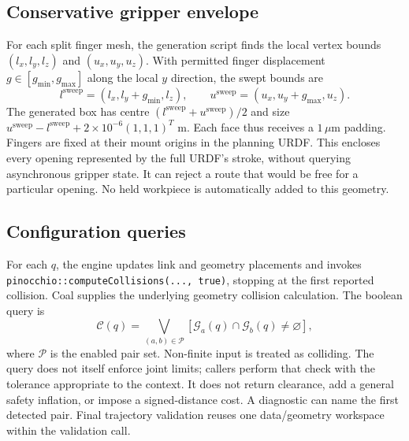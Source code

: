 \documentclass[11pt,a4paper]{report}
\newcommand{\file}[1]{\nolinkurl{#1}}
\begin{document}
\subsection{Conservative gripper envelope}
For each split finger mesh, the generation script finds the local vertex
bounds $(l_x,l_y,l_z)$ and $(u_x,u_y,u_z)$. With permitted finger displacement
$g\in[g_{\min},g_{\max}]$ along the local $y$ direction, the swept bounds are
\begin{equation}
 l^{\mathrm{sweep}}=(l_x,l_y+g_{\min},l_z),\qquad
 u^{\mathrm{sweep}}=(u_x,u_y+g_{\max},u_z).
\end{equation}
The generated box has centre $(l^{\mathrm{sweep}}+u^{\mathrm{sweep}})/2$ and
size $u^{\mathrm{sweep}}-l^{\mathrm{sweep}}+2\times10^{-6}(1,1,1)^T$ m.
Each face thus receives a $1\,\mu$m padding. Fingers are fixed at their
mount origins in the planning URDF. This encloses every opening represented
by the full URDF's stroke, without querying asynchronous gripper state.
It can reject a route that would be free for a particular opening. No held
workpiece is automatically added to this geometry.

\subsection{Configuration queries}
For each $q$, the engine updates link and geometry placements and invokes
\file{pinocchio::computeCollisions(..., true)}, stopping at the first reported
collision. Coal supplies the underlying geometry collision calculation.
The boolean query is
\begin{equation}
 \mathcal C(q)=\bigvee_{(a,b)\in\mathcal P}
 \left[\mathcal G_a(q)\cap\mathcal G_b(q)\ne\varnothing\right],
\end{equation}
where $\mathcal P$ is the enabled pair set. Non-finite input is treated as
colliding. The query does not itself enforce joint limits; callers perform
that check with the tolerance appropriate to the context. It does not return
clearance, add a general safety inflation, or impose a signed-distance cost.
A diagnostic can name the first detected pair. Final trajectory validation
reuses one data/geometry workspace within the validation call.
\end{document}
